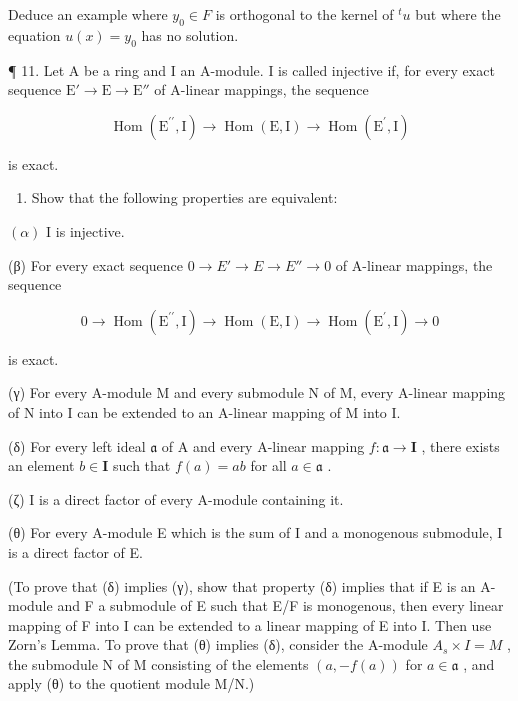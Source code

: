 Deduce an example where \(y_{0} \in F\) is orthogonal to the kernel of \(^{t}u\) but where the equation \(u(x) = y_{0}\) has no solution.

¶ 11. Let A be a ring and I an A-module. I is called injective if, for every exact sequence \(\mathrm{E}' \to \mathrm{E} \to \mathrm{E}''\) of A-linear mappings, the sequence

\[
\operatorname{Hom} \left(\mathrm{E} ^ {\prime \prime}, \mathrm{I}\right)\rightarrow \operatorname{Hom} (\mathrm{E}, \mathrm{I}) \rightarrow \operatorname{Hom} \left(\mathrm{E} ^ {\prime}, \mathrm{I}\right)
\]

is exact.

\begin{enumerate}
\def\labelenumi{(\alph{enumi})}
\tightlist
\item
  Show that the following properties are equivalent:
\end{enumerate}

\((\alpha)\) I is injective.

(β) For every exact sequence \(0 \rightarrow E' \rightarrow E \rightarrow E'' \rightarrow 0\) of A-linear mappings, the sequence

\[
0 \rightarrow \operatorname{Hom} (\mathrm{E} ^ {\prime \prime}, \mathrm{I}) \rightarrow \operatorname{Hom} (\mathrm{E}, \mathrm{I}) \rightarrow \operatorname{Hom} (\mathrm{E} ^ {\prime}, \mathrm{I}) \rightarrow 0
\]

is exact.

(γ) For every A-module M and every submodule N of M, every A-linear mapping of N into I can be extended to an A-linear mapping of M into I.

(δ) For every left ideal \(\mathfrak{a}\) of A and every A-linear mapping \(f: \mathfrak{a} \to \mathbf{I}\) , there exists an element \(b \in \mathbf{I}\) such that \(f(a) = ab\) for all \(a \in \mathfrak{a}\) .

(ζ) I is a direct factor of every A-module containing it.

(θ) For every A-module E which is the sum of I and a monogenous submodule, I is a direct factor of E.

(To prove that (δ) implies (γ), show that property (δ) implies that if E is an A-module and F a submodule of E such that E/F is monogenous, then every linear mapping of F into I can be extended to a linear mapping of E into I. Then use Zorn's Lemma. To prove that (θ) implies (δ), consider the A-module \(A_{s} \times I = M\) , the submodule N of M consisting of the elements \((a, -f(a))\) for \(a \in \mathfrak{a}\) , and apply (θ) to the quotient module M/N.)

